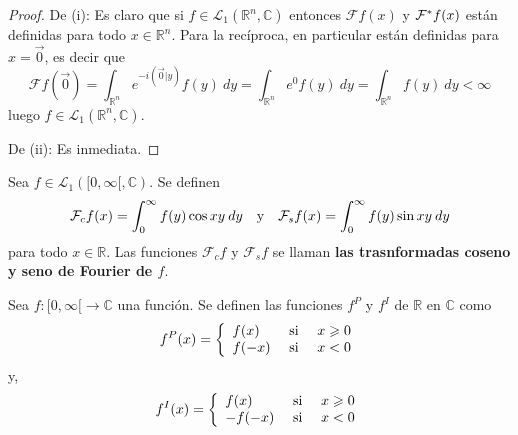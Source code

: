 \documentclass[12pt]{report}
\theoremstyle{largebreak}
\renewcommand{\geq}{\ensuremath{\geqslant}}
\newcommand\cf[3]{\ensuremath{#1:#2\rightarrow#3}}
\newcommand\pint[2]{\ensuremath{\left(#1\big| #2\right)}}
\newcommand{\fou}[1]{\ensuremath{\mathcal{F}#1}}
\begin{document}
    \begin{proof}
        De (i): Es claro que si $f\in\mathcal{L}_1(\mathbb{R}^n,\mathbb{C})$ entonces $\fou{f}(x)$ y $\fou^*{f}(x)$ están definidas para todo $x\in\mathbb{R}^n$. Para la recíproca, en particular están definidas para $x=\vec{0}$, es decir que
        \begin{equation*}
            \fou{f}\left(\vec{0}\right)=\int_{\mathbb{R}^n}e^{ -i\pint{\vec{0}}{y}}f(y)\:dy=\int_{\mathbb{R}^n}e^{0}f(y)\:dy=\int_{\mathbb{R}^n}f(y)\:dy<\infty
        \end{equation*}
        luego $f\in\mathcal{L}_1(\mathbb{R}^n,\mathbb{C})$.

        De (ii): Es inmediata.
    \end{proof}

    \begin{mydef}
        Sea $f\in\mathcal{L}_1([0,\infty[,\mathbb{C})$. Se definen
        \begin{equation*}
            \mathcal{F}_cf(x)=\int_0^\infty f(y)\cos xy\:dy\quad\textup{y}\quad\mathcal{F}_sf(x)=\int_0^\infty f(y)\sin xy\:dy
        \end{equation*}
        para todo $x\in\mathbb{R}$. Las funciones $\mathcal{F}_cf$ y  $\mathcal{F}_sf$ se llaman \textbf{las trasnformadas coseno y seno de Fourier de $f$}.
    \end{mydef}

    \begin{mydef}
        Sea $\cf{f}{[0,\infty[}{\mathbb{C}}$ una función. Se definen las funciones $f^P$ y $f^I$ de $\mathbb{R}$ en $\mathbb{C}$ como
        \begin{equation*}
            f^P(x)=\left\{ 
                \begin{array}{lcr}
                    f(x) & \textup{ si } & x\geq0\\
                    f(-x) & \textup{ si } & x<0\\
                \end{array}
            \right.
        \end{equation*}
        y,
        \begin{equation*}
            f^I(x)=\left\{ 
                \begin{array}{lcr}
                    f(x) & \textup{ si } & x\geq0\\
                    -f(-x) & \textup{ si } & x<0\\
                \end{array}
            \right.
        \end{equation*}
    \end{mydef}
\end{document}
